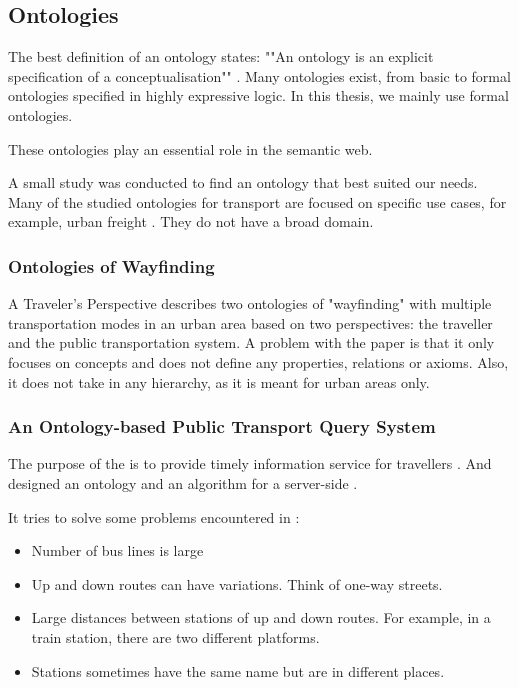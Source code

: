 \subsection{Ontologies}
The best definition of an ontology states: ""An ontology is an explicit specification of a conceptualisation"" \cite{gruber_translation_1993}. Many ontologies exist, from basic to formal ontologies specified in highly expressive logic. In this thesis, we mainly use formal ontologies.

These ontologies play an essential role in the semantic web. 

A small study was conducted to find an ontology that best suited our needs. Many of the studied ontologies for transport are focused on specific use cases, for example, urban freight \cite{bouhana_ontology-based_2015}. They do not have a broad domain. 

\subsubsection{Ontologies of Wayfinding}
A Traveler’s Perspective \cite{timpf_ontologies_2002} describes two ontologies of "wayfinding" with multiple transportation modes in an urban area based on two perspectives: the traveller and the public transportation system. A problem with the paper is that it only focuses on concepts and does not define any properties, relations or axioms. Also, it does not take in any hierarchy, as it is meant for urban areas only.

\subsubsection{An Ontology-based Public Transport Query System}
The purpose of the  is to provide timely information
service for travellers \cite{wang_ontology-based_2005}. And designed an ontology and an algorithm for a server-side .

It tries to solve some problems encountered in :\begin{itemize}
    \item Number of bus lines is large
    \item Up and down routes can have variations. Think of one-way streets.
    \item Large distances between stations of up and down routes. For example, in a train station, there are two different platforms.
    \item Stations sometimes have the same name but are in different places.
\end{itemize}

